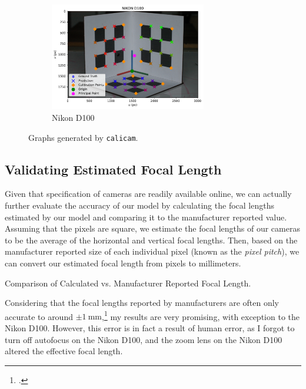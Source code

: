 \begin{figure}[H]
    \ContinuedFloat
    \centering
    \begin{subfigure}{\textwidth}
        \centering
        \includegraphics[width=0.75\textwidth]{assets/results/NIKON D100/graph.pdf}
        \caption{Nikon D100}
    \end{subfigure}
    \caption{Graphs generated by \texttt{calicam}.}
\end{figure}

\subsection{Validating Estimated Focal Length}
Given that specification of cameras are readily available online, we can actually further evaluate the accuracy of our model by calculating the focal lengths estimated by our model and comparing it to the manufacturer reported value. Assuming that the pixels are square, we estimate the focal lengths of our cameras to be the average of the horizontal and vertical focal lengths. Then, based on the manufacturer reported size of each individual pixel (known as the \emph{pixel pitch}), we can convert our estimated focal length from pixels to millimeters.

\begin{table}[H]
    \centering
    
    \caption{Comparison of Calculated vs. Manufacturer Reported Focal Length.}
\end{table}

Considering that the focal lengths reported by manufacturers are often only accurate to around $\pm \qty{1}{\milli\meter}$,\footcite{waynefAnswerAre2017} my results are very promising, with exception to the Nikon D100. However, this error is in fact a result of human error, as I forgot to turn off autofocus on the Nikon D100, and the zoom lens on the Nikon D100 altered the effective focal length.


